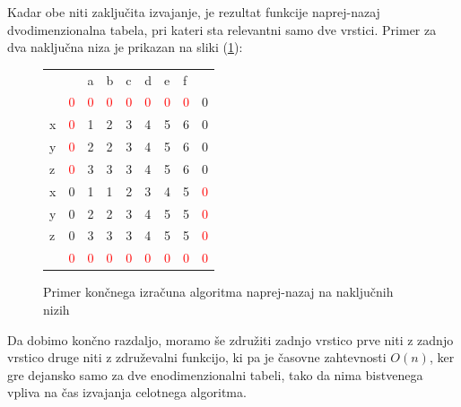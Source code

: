 \documentclass[a4paper,12pt,openright]{book}
\begin{document}
Kadar obe niti zaključita izvajanje, je rezultat funkcije naprej-nazaj dvodimenzionalna tabela, pri kateri sta relevantni samo dve vrstici. Primer za dva naključna niza je prikazan na sliki (\ref{fbLCSresult}):

\begin{figure}[htb]
\begin{center}
\begin{tabular}{|l|l|l|l|l|l|l|l|l|}
\cline{3-8}
  \multicolumn{2}{c|}{}  & a & b & c & d & e & f & \multicolumn{1}{|c}{} \\ \cline{2-9}
 \multicolumn{1}{c|}{} & \textcolor{red}{0} & \textcolor{red}{0} & \textcolor{red}{0} & \textcolor{red}{0} & \textcolor{red}{0} & \textcolor{red}{0} & \textcolor{red}{0} & 0 \\ \hline
x  & \textcolor{red}{0}  & 1 &  2 & 3 & 4 & 5 & 6 & 0 \\ \hline
y  & \textcolor{red}{0} & 2 & 2 & 3 & 4 & 5 & 6 & 0 \\ \hline
z  & \textcolor{red}{0} & \cellcolor{blue!15}3 & \cellcolor{blue!15}3 & \cellcolor{blue!15}3 & \cellcolor{blue!15}4 & \cellcolor{blue!15}5 & \cellcolor{blue!15}6 & 0 \\ \hline
x  & 0 & \cellcolor{blue!15}1  & \cellcolor{blue!15}1 &  \cellcolor{blue!15}2 & \cellcolor{blue!15}3 & \cellcolor{blue!15}4 & \cellcolor{blue!15}5 & \textcolor{red}{0} \\ \hline
y  & 0 & 2 & 2 & 3 & 4 & 5 & 5 & \textcolor{red}{0} \\ \hline
z  & 0 & 3 & 3 & 3 & 4 & 5 & 5 & \textcolor{red}{0} \\ \hline
\multicolumn{1}{c|}{}  & \textcolor{red}{0} & \textcolor{red}{0} & \textcolor{red}{0} & \textcolor{red}{0} & \textcolor{red}{0} & \textcolor{red}{0} & \textcolor{red}{0} & \textcolor{red}{0} \\ \cline{2-9}
\end{tabular}

\end{center}
\caption{Primer končnega izračuna algoritma naprej-nazaj na naključnih nizih}
\label{fbLCSresult}
\end{figure}

Da dobimo končno razdaljo, moramo še združiti zadnjo vrstico prve niti z zadnjo vrstico druge niti z združevalni funkcijo, ki pa je časovne zahtevnosti \begin{math}O(n)\end{math}, ker gre dejansko samo za dve enodimenzionalni tabeli, tako da nima bistvenega vpliva na čas izvajanja celotnega algoritma. 
\end{document}

